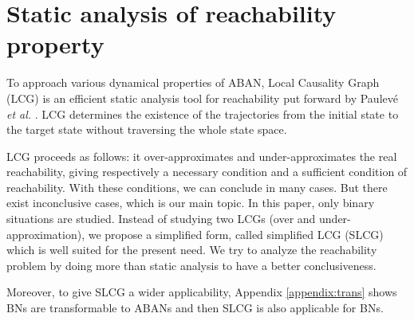 \documentclass[runningheads]{llncs}
\begin{document}
\section{Static analysis of reachability property}\label{sect:3}
To approach various dynamical properties of ABAN, Local Causality Graph (LCG) is an efficient static analysis tool for reachability put forward by Paulev\'e \textit{et al.} \cite{pauleve2011}. 
LCG determines the existence of the trajectories from the initial state to the target state without traversing the whole state space.

LCG proceeds as follows: it over-approximates and under-approximates the real reachability, giving respectively a necessary condition and a sufficient condition of reachability. 
With these conditions, we can conclude in many cases.
But there exist inconclusive cases, which is our main topic.
In this paper, only binary situations are studied.
Instead of studying two LCGs (over and under-approximation), we propose a simplified form, called simplified LCG (SLCG) which is well suited for the present need.
We try to analyze the reachability problem by doing more than static analysis to have a better conclusiveness.

Moreover, to give SLCG a wider applicability, Appendix \ref{appendix:trans} shows BNs are transformable to ABANs and then SLCG is also applicable for BNs.
\end{document}
